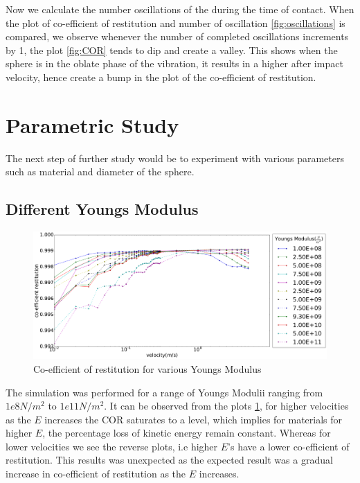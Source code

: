 Now we calculate the number oscillations of the during the time of contact. When the plot of co-efficient of restitution and number of oscillation \ref{fig:oscillations} is compared, we observe whenever the number of completed oscillations increments by 1, the plot \ref{fig:COR} tends to dip and create a valley. This shows when the sphere is in the oblate  phase of the vibration, it results in a higher after impact velocity, hence create a bump in the plot of the co-efficient of restitution.




\section{Parametric Study}

The next step of further study would be to experiment with various parameters such as material and diameter of the sphere.


\subsection{Different Youngs Modulus}

\begin{figure}[H]
\includegraphics[width=1.0\textwidth]{../images/parametricStudy/CORdiffE_pdf.pdf}
\caption{Co-efficient of restitution for various Youngs Modulus}
\label{fig:CORdiffEcomplete}
\end{figure}

The simulation was performed for a range of Youngs Modulii ranging from $1e8N/m^{2}$ to $1e11N/m^{2}$. It can be observed from the plots \ref{fig:CORdiffEcomplete}, for higher velocities as the $E$ increases the COR saturates to a level, which implies for materials for higher $E$, the percentage loss of kinetic energy remain constant. Whereas for lower velocities we see the reverse plots, i.e higher $E$'s have a lower co-efficient of restitution. This results was unexpected as the expected result was a gradual increase in co-efficient of restitution as the $E$ increases. 


